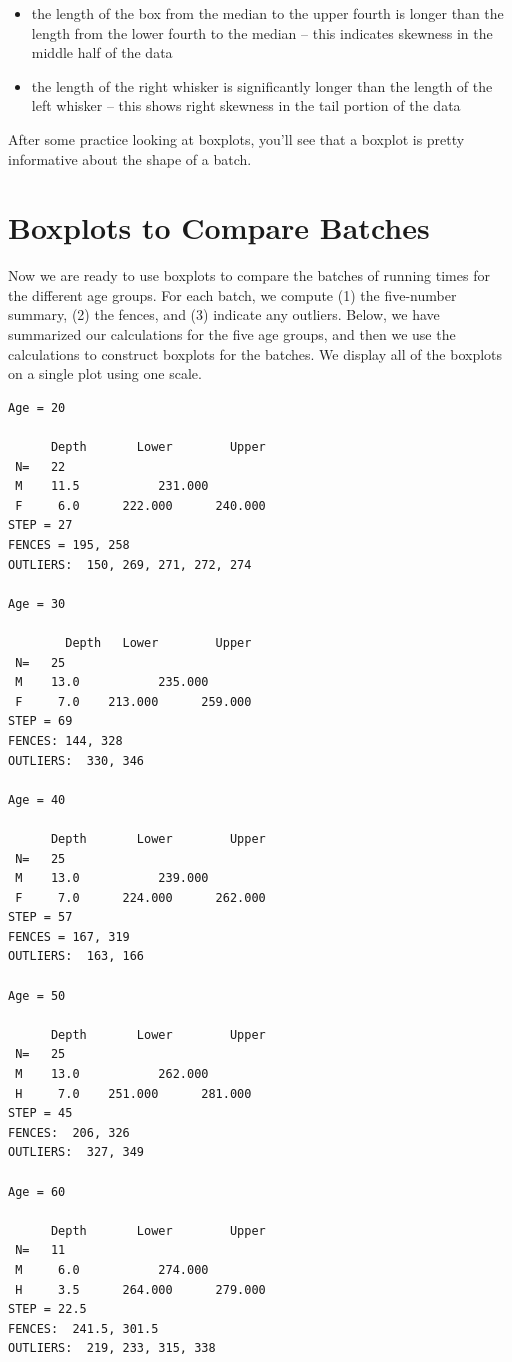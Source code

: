 \documentclass[
]{book}
\providecommand{\tightlist}{%
  \setlength{\itemsep}{0pt}\setlength{\parskip}{0pt}}
\begin{document}
\begin{itemize}
\tightlist
\item
  the length of the box from the median to the upper fourth is longer than the length from the lower fourth to the median -- this indicates skewness in the middle half of the data
\item
  the length of the right whisker is significantly longer than the length of the left whisker -- this shows right skewness in the tail portion of the data
\end{itemize}

After some practice looking at boxplots, you'll see that a boxplot is pretty informative about the shape of a batch.

\hypertarget{boxplots-to-compare-batches}{%
\section{Boxplots to Compare Batches}\label{boxplots-to-compare-batches}}

Now we are ready to use boxplots to compare the batches of running times for the different age groups. For each batch, we compute (1) the five-number summary, (2) the fences, and (3) indicate any outliers. Below, we have summarized our calculations for the five age groups, and then we use the calculations to construct boxplots for the batches. We display all of the boxplots on a single plot using one scale.

\begin{verbatim}
Age = 20

      Depth       Lower        Upper                
 N=   22                        
 M    11.5           231.000                
 F     6.0      222.000      240.000        
STEP = 27                       
FENCES = 195, 258                   
OUTLIERS:  150, 269, 271, 272, 274      

Age = 30

        Depth   Lower        Upper 
 N=   25
 M    13.0           235.000         
 F     7.0    213.000      259.000 
STEP = 69
FENCES: 144, 328
OUTLIERS:  330, 346

Age = 40    

      Depth       Lower        Upper  
 N=   25                        
 M    13.0           239.000                    
 F     7.0      224.000      262.000            
STEP = 57                       
FENCES = 167, 319                   
OUTLIERS:  163, 166                 

Age = 50  

      Depth       Lower        Upper
 N=   25
 M    13.0           262.000         
 H     7.0    251.000      281.000 
STEP = 45
FENCES:  206, 326
OUTLIERS:  327, 349

Age = 60

      Depth       Lower        Upper       
 N=   11
 M     6.0           274.000               
 H     3.5      264.000      279.000       
STEP = 22.5
FENCES:  241.5, 301.5
OUTLIERS:  219, 233, 315, 338
\end{verbatim}
\end{document}
